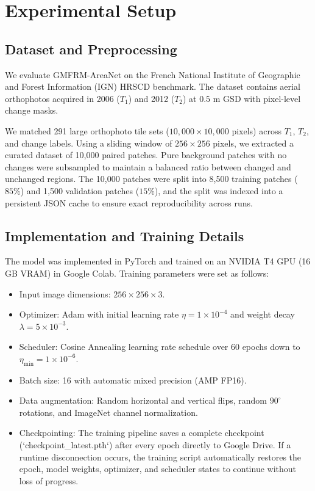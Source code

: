 \documentclass[final,5p,times,twocolumn]{elsarticle}
\begin{document}
\section{Experimental Setup}
\label{sec:experiments}

\subsection{Dataset and Preprocessing}
We evaluate GMFRM-AreaNet on the French National Institute of Geographic and Forest Information (IGN) HRSCD benchmark. The dataset contains aerial orthophotos acquired in 2006 ($T_1$) and 2012 ($T_2$) at $0.5\text{ m}$ GSD with pixel-level change masks. 

We matched 291 large orthophoto tile sets ($10{,}000 \times 10{,}000$ pixels) across $T_1$, $T_2$, and change labels. Using a sliding window of $256 \times 256$ pixels, we extracted a curated dataset of 10,000 paired patches. Pure background patches with no changes were subsampled to maintain a balanced ratio between changed and unchanged regions. The 10,000 patches were split into 8,500 training patches ($85\%$) and 1,500 validation patches ($15\%$), and the split was indexed into a persistent JSON cache to ensure exact reproducibility across runs.

\subsection{Implementation and Training Details}
The model was implemented in PyTorch and trained on an NVIDIA T4 GPU (16 GB VRAM) in Google Colab. Training parameters were set as follows:
\begin{itemize}
    \item Input image dimensions: $256 \times 256 \times 3$.
    \item Optimizer: Adam with initial learning rate $\eta = 1 \times 10^{-4}$ and weight decay $\lambda = 5 \times 10^{-3}$.
    \item Scheduler: Cosine Annealing learning rate schedule over 60 epochs down to $\eta_{\min} = 1 \times 10^{-6}$.
    \item Batch size: 16 with automatic mixed precision (AMP FP16).
    \item Data augmentation: Random horizontal and vertical flips, random $90^\circ$ rotations, and ImageNet channel normalization.
    \item Checkpointing: The training pipeline saves a complete checkpoint (`checkpoint\_latest.pth`) after every epoch directly to Google Drive. If a runtime disconnection occurs, the training script automatically restores the epoch, model weights, optimizer, and scheduler states to continue without loss of progress.
\end{itemize}
\end{document}
